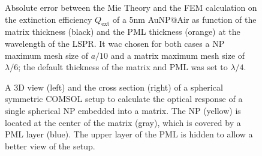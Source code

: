 \begin{figure}[h!]\centering
	\def\svgwidth{\textwidth} \small
{}
\vspace*{-1em}
\caption[Extinction Efficiency Absolute Error: Matrix and PML Thickness Analysis]{Absolute error between the Mie Theory and the FEM calculation on the extinction efficiency $Q_\text{ext}$ of a 5nm AuNP$@$Air as function of the matrix thickness (black) and the PML thickness (orange) at the wavelength of the LSPR. It wac chosen for both cases a NP maximum mesh size of $a/10$ and a matrix maximum mesh size of $\lambda/6$; the default thickness of the matrix and PML was set to $\lambda/4$.}
\label{fig:Eff:sphere:thickness}
\end{figure}








%
%
%




\begin{figure}[h!]\centering
	\def\svgwidth{.8\textwidth} \small
\vspace*{0em}
\caption[Spherical symmetric COMSOL Setup]{A 3D view (left) and the cross section (right) of a spherical symmetric COMSOL setup to calculate the optical response of a single spherical NP embedded into a matrix. The NP (yellow) is located at the center of the matrix (gray), which is covered by a PML layer (blue). The upper layer of the PML is hidden to allow a better view of the setup.}
\label{fig:setup:sphere}
\end{figure}

